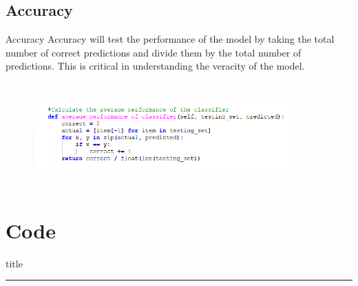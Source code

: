 \documentclass{beamer}
\begin{document}
\subsection{Accuracy}
    \begin{frame}{Accuracy}
    \hspace{0.5cm} Accuracy will test the performance of the model by taking the total number of correct predictions and divide them by the total number of predictions. This is critical in understanding the veracity of the model. \\
    \begin{center}
        \begin{figure}
            \begin{center}
                \includegraphics[width = 10cm, height = 4cm]{Theme/images/average.PNG}
            \end{center}
        \end{figure}
    \end{center}
    \end{frame}

\section{Code}
    \begin{frame}[plain]
        \vfill
      \centering
      \begin{beamercolorbox}[sep=8pt,center,shadow=true,rounded=true]{title}
        \insertsectionhead\par%
        \color{oxfordblue}\noindent\rule{10cm}{1pt} \\
        \LARGE{\faFileTextO}
      \end{beamercolorbox}
      \vfill
  \end{frame}
\end{document}
